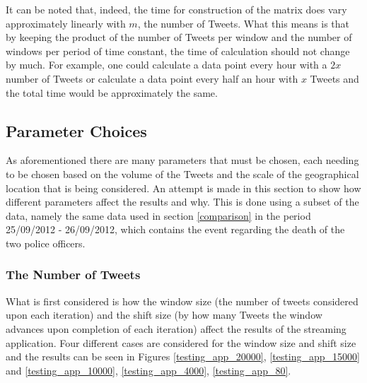 \documentclass[11pt,a4paper]{article}
\begin{document}
It can be noted that, indeed, the time for construction of the matrix does vary approximately linearly with $m$, the number of Tweets. What this means is that by keeping the product of the number of Tweets per window and the number of windows per period of time constant, the time of calculation should not change by much. For example, one could calculate a data point every hour with a $2x$ number of Tweets or calculate a data point every half an hour with $x$ Tweets and the total time would be approximately the same.

\subsection{Parameter Choices}

As aforementioned there are many parameters that must be chosen, each needing to be chosen based on the volume of the Tweets and the scale of the geographical location that is being considered. An attempt is made in this section to show how different parameters affect the results and why. This is done using a subset of the data, namely the same data used in section \ref{comparison} in the period 25/09/2012 - 26/09/2012, which contains the event regarding the death of the two police officers.

\subsubsection{The Number of Tweets}
 
What is first considered is how the window size (the number of tweets considered upon each iteration) and the shift size (by how many Tweets the window advances upon completion of each iteration) affect the results of the streaming application. Four different cases are considered for the window size and shift size and the results can be seen in Figures \ref{testing_app_20000}, \ref{testing_app_15000} and \ref{testing_app_10000}, \ref{testing_app_4000}, \ref{testing_app_80}. 
\end{document}
